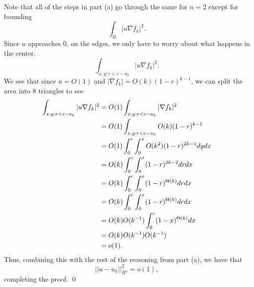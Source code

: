 \documentclass{article}
\newcommand{\D}{\nabla}
\begin{document}
\begin{enumerate}[(a)]
    Note that all of the steps in part (a) go through the same for $n=2$ except for bounding 
    \[\int_B|u \D f_k|^2.\]
    Since $u$ approaches 0, on the edges, we only have to worry about what happens in the center. 
    \[\int_{x,y: r < c-a_k}|u \D f_k|^2.\]
    We see that since $u = O(1)$ and $|\D f_k| = O(k)(1-r)^{k-1}$, we can split the area into 8 triangles to see
    \begin{align*}
        \int_{x,y : r < c-a_k}|u \D f_k|^2 &= O(1) \int_{x,y : r < c-a_k}|\D f_k|^2 \\
        &=  O(1)\int_{x,y : r < c-a_k} O(k)(1-r)^{k-1} \\
        &= O(1)\int_0^c\int_0^x O(k^2)(1-r)^{2k-1} dydx \\
        &= O(k)\int_0^c\int_0^x (1-r)^{2k-2} drdx \\
        &= O(k)\int_0^c\int_0^x (1-r)^{\Theta(k)} drdx \\
        &= O(k)\int_0^c\int_0^x (1-r)^{\Theta(k)} drdx \\
        &= O(k)O(k\inv)\int_0^c (1-x)^{\Theta(k)} dx \\
        &= O(k)O(k\inv)O(k\inv)\\
        &= o(1).
    \end{align*}
    Thus, combining this with the rest of the reasoning from part (a), we have that 
    \[||u-u_k||_{H^1}^2 = o(1),\]
    completing the proof. \qed

\end{enumerate}
\end{document}

